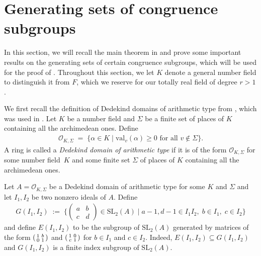 \documentclass[11pt]{amsart}
\theoremstyle{remark}
\newcommand\m[1]{\begin{pmatrix}#1\end{pmatrix}}
\newcommand\sm[1]{\begin{psmallmatrix}#1\end{psmallmatrix}}
\newcommand{\clo}{\mathcal{O}}
\newcommand{\eq}{\;=\;}
\newcommand{\deq}{\;:=\;}
\newcommand{\SL}{\mathrm{SL}}
\newcommand{\val}{\mathrm{val}}
\begin{document}
\section{Generating sets of congruence subgroups}
\label{generating-sect}
In this section, we will recall the main theorem in \cite{vaserstein} and prove some important results on the generating sets of certain congruence subgroups, which will be used for the proof of . Throughout this section, we let $K$ denote a general number field to distinguish it from $F$, which we reserve for our totally real field of degree $r>1$.

We first recall the definition of Dedekind domains of arithmetic type from \cite{dedearith}, which was used in \cite{vaserstein}. Let $K$ be a number field and $\Sigma$ be a finite set of places of $K$ containing all the archimedean ones. Define
\begin{align*}
    \clo_{K,\Sigma}\eq\{\alpha\in K\mid \val_v(\alpha)\geq 0\text{ for all }v\notin \Sigma\}.
\end{align*}
A ring is called a \textit{Dedekind domain of arithmetic type} if it is of the form $\clo_{K,\Sigma}$ for some number field~$K$ and some finite set $\Sigma$ of places of $K$ containing all the archimedean ones.

Let $A=\clo_{K,\Sigma}$ be a Dedekind domain of arithmetic type for some $K$ and $\Sigma$ and let $I_1,I_2$ be two nonzero ideals of $A$. Define
\begin{align*}
    G(I_1,I_2)\deq\bigg\{\m{a&b\\c&d}\in\SL_2(A)\;\bigg|\; a-1,d-1\in I_1I_2,\;b\in I_1,\;c\in I_2\bigg\}
\end{align*}
and define $E(I_1,I_2)$ to be the subgroup of $\SL_2(A)$ generated by matrices of the form $\sm{1&b\\0&1}$ and $\sm{1&0\\c&1}$ for $b\in I_1$ and $c\in I_2$. Indeed, $E(I_1,I_2)\subseteq G(I_1,I_2)$ and $G(I_1,I_2)$ is a finite index subgroup of $\SL_2(A)$.
\end{document}
